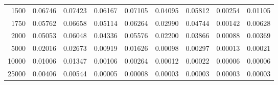 \begin{table}[ht]
\begin{tabular}{r|c|c|c|c|c|c|c|c}
     1500 & 0.06746 & 0.07423 & 0.06167 & 0.07105 & 0.04095 & 0.05812 & 0.00254 & 0.01105 \\
     1750 & 0.05762 & 0.06658 & 0.05114 & 0.06264 & 0.02990 & 0.04744 & 0.00142 & 0.00628 \\
     2000 & 0.05053 & 0.06048 & 0.04336 & 0.05576 & 0.02200 & 0.03866 & 0.00088 & 0.00369 \\
     5000 & 0.02016 & 0.02673 & 0.00919 & 0.01626 & 0.00098 & 0.00297 & 0.00013 & 0.00021 \\
    10000 & 0.01006 & 0.01347 & 0.00106 & 0.00264 & 0.00012 & 0.00022 & 0.00006 & 0.00006 \\
    25000 & 0.00406 & 0.00544 & 0.00005 & 0.00008 & 0.00003 & 0.00003 & 0.00003 & 0.00003 \\ \cline{1-9}
    \end{tabular}
    \label{tab:XRayEffODE}
\end{table}